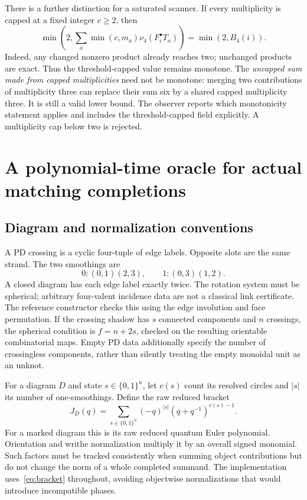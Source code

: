 \documentclass[11pt]{article}
\theoremstyle{definition}
\theoremstyle{remark}
\newcommand{\nuFour}{\nu_4}
\begin{document}
There is a further distinction for a saturated scanner. If every multiplicity
is capped at a fixed integer $c\ge2$, then
\[
 \min\!\left(2,\sum_a\min(c,m_a)\nuFour(F_i^\bullet T_a)\right)
 =\min(2,B_4(i)).
\]
Indeed, any changed nonzero product already reaches two; unchanged products
are exact. Thus the threshold-capped value remains monotone. The
\emph{uncapped sum made from capped multiplicities} need not be monotone:
merging two contributions of multiplicity three can replace their sum six
by a shared capped multiplicity three. It is still a valid lower bound.
The observer reports which monotonicity statement applies and includes the
threshold-capped field explicitly. A multiplicity cap below two is rejected.

\section{A polynomial-time oracle for actual matching completions}
\label{sec:oracle}

\subsection{Diagram and normalization conventions}
A PD crossing is a cyclic four-tuple of edge labels. Opposite slots are the
same strand. The two smoothings are
\[
 0:(0,1)(2,3),\qquad 1:(0,3)(1,2).
\]
A closed diagram has each edge label exactly twice. The rotation system must
be spherical; arbitrary four-valent incidence data are not a classical link
certificate. The reference constructor checks this using the edge
involution and face permutation. If the crossing shadow has $s$ connected
components and $n$ crossings, the spherical condition is $f=n+2s$, checked
on the resulting orientable combinatorial maps. Empty PD data additionally
specify the number of crossingless components, rather than silently treating
the empty monoidal unit as an unknot.

For a diagram $D$ and state $s\in\{0,1\}^n$, let $c(s)$ count its resolved
circles and $|s|$ its number of one-smoothings. Define the raw reduced bracket
\begin{equation}\label{eq:bracket}
 J_D(q)=\sum_{s\in\{0,1\}^n}(-q)^{|s|}
             (q+q^{-1})^{c(s)-1}.
\end{equation}
For a marked diagram this is its raw reduced quantum Euler polynomial.
Orientation and writhe normalization multiply it by an overall signed
monomial. Such factors must be tracked consistently when summing object
contributions but do not change the norm of a whole completed summand.
The implementation uses~\eqref{eq:bracket} throughout, avoiding objectwise
normalizations that would introduce incompatible phases.
\end{document}
